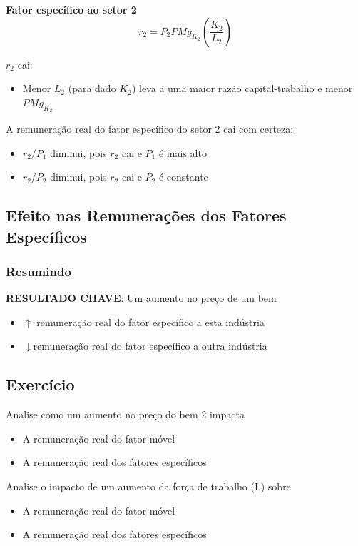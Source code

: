 \documentclass[a4paper,12pt]{article}[abntex2]
\begin{document}
\textbf{Fator específico ao setor 2}
\[
r_2 = P_2 PMg_{K_2} \left( \frac{\bar{K}_2}{L_2} \right)
\]

$r_2$ cai:
\begin{itemize}
  \item Menor $L_2$ (para dado $\bar{K}_2$) leva a uma maior razão capital-trabalho e menor $PMg_{K_2}$
\end{itemize}

A remuneração real do fator específico do setor 2 cai com certeza:
\begin{itemize}
  \item $r_2 / P_1$ diminui, pois $r_2$ cai e $P_1$ é mais alto
  \item $r_2 / P_2$ diminui, pois $r_2$ cai e $P_2$ é constante
\end{itemize}

\subsection{\textbf{Efeito nas Remunerações dos Fatores Específicos}}
\subsubsection{\textbf{Resumindo}}
\textbf{RESULTADO CHAVE}: Um aumento no preço de um bem\begin{itemize}
    \item \(\uparrow\) remuneração real do fator específico a esta indústria
    \item \(\downarrow\)remuneração real do fator específico a outra indústria
\end{itemize}

\subsection{\textbf{Exercício}}
 Analise como um aumento no preço do bem 2 impacta\begin{itemize}
    \item A remuneração real do fator móvel
    \item A remuneração real dos fatores específicos
\end{itemize}

Analise o impacto de um aumento da força de trabalho (L)  sobre\begin{itemize}
    \item A remuneração real do fator móvel
    \item A remuneração real dos fatores específicos
\end{itemize}
\end{document}

